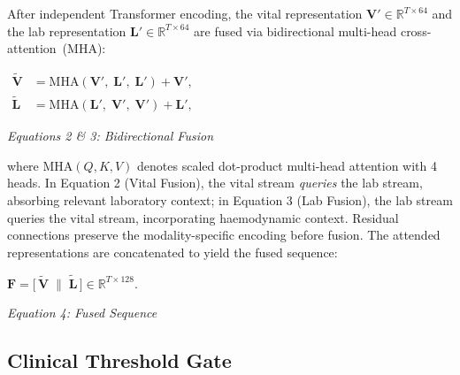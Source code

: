 \documentclass[conference,12pt]{IEEEtran}
\begin{document}
After independent Transformer encoding, the vital representation
$\mathbf{V}' \in \mathbb{R}^{T \times 64}$ and the lab representation
$\mathbf{L}' \in \mathbb{R}^{T \times 64}$ are fused via bidirectional
multi-head cross-attention~(MHA):
%
\vspace{1em}
\begin{center}
  $\displaystyle
  \boxed{
  \begin{aligned}
  \tilde{\mathbf{V}} &= \mathrm{MHA}(\mathbf{V}',\;\mathbf{L}',\;\mathbf{L}')
                        + \mathbf{V}', \\[2pt]
  \tilde{\mathbf{L}} &= \mathrm{MHA}(\mathbf{L}',\;\mathbf{V}',\;\mathbf{V}')
                        + \mathbf{L}',
  \end{aligned}
  }
  $
  \vspace{0.5em}
  
  \textit{Equations 2 \& 3: Bidirectional Fusion}
\end{center}
\vspace{1em}
%
where $\mathrm{MHA}(Q, K, V)$ denotes scaled dot-product multi-head attention
with 4 heads.
In Equation 2 (Vital Fusion), the vital stream \emph{queries} the lab stream, absorbing
relevant laboratory context; in Equation 3 (Lab Fusion), the lab stream queries the
vital stream, incorporating haemodynamic context.
Residual connections preserve the modality-specific encoding before fusion.
The attended representations are concatenated to yield the fused sequence:
%
\vspace{1em}
\begin{center}
  $\displaystyle
  \boxed{
  \mathbf{F}
    = \bigl[\,\tilde{\mathbf{V}} \;\big\|\; \tilde{\mathbf{L}}\,\bigr]
    \in \mathbb{R}^{T \times 128}.
  }
  $
  \vspace{0.5em}
  
  \textit{Equation 4: Fused Sequence}
\end{center}
\vspace{1em}

\subsection{\textbf{Clinical Threshold Gate}}
\label{sec:gate}
\end{document}
